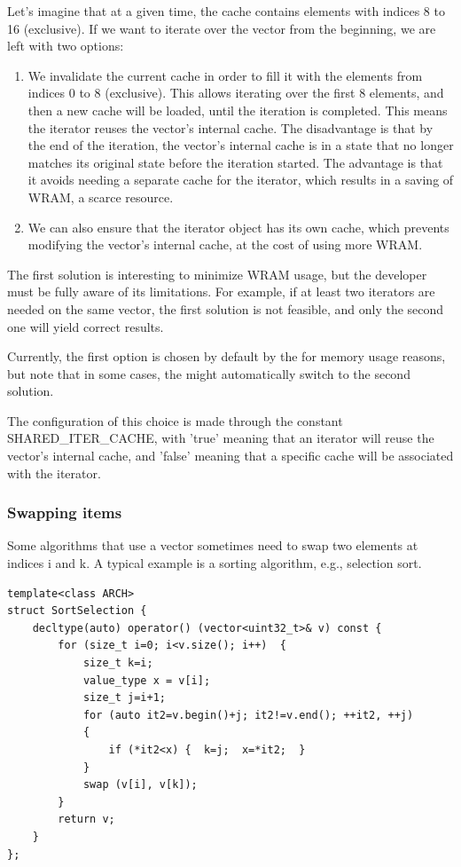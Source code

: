 Let’s imagine that at a given time, the cache contains elements with indices 8 to 16 (exclusive). If we want to iterate over the vector from the beginning, we are left with two options:

\begin{enumerate}

 \item We invalidate the current cache in order to fill it with the elements from indices 0 to 8 (exclusive). This allows iterating over the first 8 elements, and then a new cache will be loaded, until the iteration is completed. This means the iterator reuses the vector's internal cache. The disadvantage is that by the end of the iteration, the vector’s internal cache is in a state that no longer matches its original state before the iteration started. The advantage is that it avoids needing a separate cache for the iterator, which results in a saving of WRAM, a scarce resource.
 
 \item We can also ensure that the iterator object has its own cache, which prevents modifying the vector's internal cache, at the cost of using more WRAM.
 
\end{enumerate}

The first solution is interesting to minimize WRAM usage, but the developer must be fully aware of its limitations. For example, if at least two iterators are needed on the same vector, the first solution is not feasible, and only the second one will yield correct results. 
 
Currently, the first option is chosen by default by the \BPL for memory usage reasons, but note that in some cases, the \BPL might automatically switch to  the second solution.
 
The configuration of this choice is made through the constant SHARED\_ITER\_CACHE, with 'true' meaning that an iterator will reuse the vector's internal cache, and 'false' meaning that a specific cache will be associated with the iterator.

\subsubsection{Swapping items}

Some algorithms that use a vector sometimes need to swap two elements at indices i and k. A typical example is a sorting algorithm, e.g., selection sort.

\begin{verbatim}
template<class ARCH>
struct SortSelection {
    decltype(auto) operator() (vector<uint32_t>& v) const {
        for (size_t i=0; i<v.size(); i++)  {
            size_t k=i;
            value_type x = v[i];
            size_t j=i+1;
            for (auto it2=v.begin()+j; it2!=v.end(); ++it2, ++j)  
            {
                if (*it2<x) {  k=j;  x=*it2;  } 
            }
            swap (v[i], v[k]);
        }
        return v;
    }
};
\end{verbatim}

